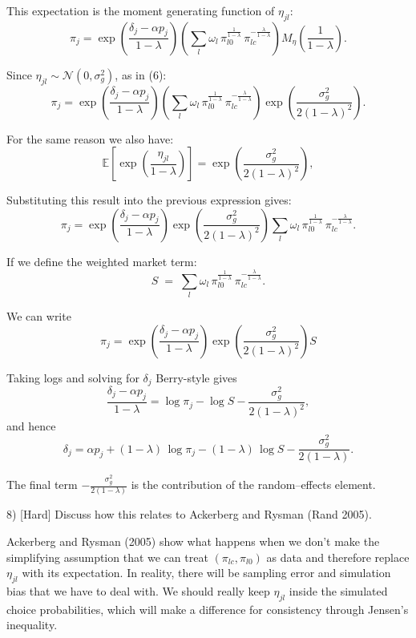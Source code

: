 \documentclass{article}
\begin{document}
This expectation is the moment generating function of $\eta_{jl}$:
\[
\pi_j
=\exp\!\left(\frac{\delta_j-\alpha p_j}{1-\lambda}\right)
\left(\sum_{l}\omega_l\,
\pi_{l0}^{\frac{1}{1-\lambda}}\,
\pi_{lc}^{-\frac{\lambda}{1-\lambda}}\right)
M_{\eta}\!\left(\frac{1}{1-\lambda}\right).
\]

Since $\eta_{jl}\sim\mathcal{N}(0,\sigma_g^2)$, as in (6):
\[
\pi_j
=\exp\!\left(\frac{\delta_j-\alpha p_j}{1-\lambda}\right)
\left(\sum_{l}\omega_l\,
\pi_{l0}^{\frac{1}{1-\lambda}}\,
\pi_{lc}^{-\frac{\lambda}{1-\lambda}}\right)
\exp\!\left(\frac{\sigma_g^{2}}{2(1-\lambda)^{2}}\right).
\]

For the same reason we also have:
\[
\mathbb{E}\!\left[\exp\!\left(\frac{\eta_{jl}}{1-\lambda}\right)\right]
=\exp\!\left(\frac{\sigma_g^{2}}{2(1-\lambda)^{2}}\right),
\]

Substituting this result into the previous expression gives:
\[
\pi_j
=\exp\!\left(\frac{\delta_j-\alpha p_j}{1-\lambda}\right)
\exp\!\left(\frac{\sigma_g^{2}}{2(1-\lambda)^{2}}\right)
\sum_{l}\omega_l\,
\pi_{l0}^{\frac{1}{1-\lambda}}\,
\pi_{lc}^{-\frac{\lambda}{1-\lambda}}.
\]

If we define the weighted market term:
\[
S \;=\; \sum_{l}\omega_l\,
\pi_{l0}^{\frac{1}{1-\lambda}}\,
\pi_{lc}^{-\frac{\lambda}{1-\lambda}}.
\]

We can write
\[
\pi_j
=\exp\!\left(\frac{\delta_j-\alpha p_j}{1-\lambda}\right)
\exp\!\left(\frac{\sigma_g^{2}}{2(1-\lambda)^{2}}\right)
S
\]

Taking logs and solving for $\delta_j$ Berry-style gives
\[
\frac{\delta_j-\alpha p_j}{1-\lambda}
=\log \pi_j - \log S - \frac{\sigma_g^{2}}{2(1-\lambda)^{2}},
\]
and hence
\[
\delta_j
= \alpha p_j
+ (1-\lambda)\,\log \pi_j
- (1-\lambda)\,\log S
- \frac{\sigma_g^{2}}{2(1-\lambda)}.
\]

The final term $-\frac{\sigma_g^{2}}{2(1-\lambda)}$ is the contribution of the random–effects element.


\begin{tcolorbox}
8) [Hard] Discuss how this relates to Ackerberg and Rysman (Rand 2005).
\end{tcolorbox}

Ackerberg and Rysman (2005) show what happens when we don't make the simplifying assumption that we can treat $(\pi_{lc},\pi_{l0})$ as data and therefore replace $\eta_{jl}$ with its expectation. In reality, there will be sampling error and simulation bias that we have to deal with. We should really keep $\eta_{jl}$ inside the simulated choice probabilities, which will make a difference for consistency through Jensen's inequality.
\end{document}
